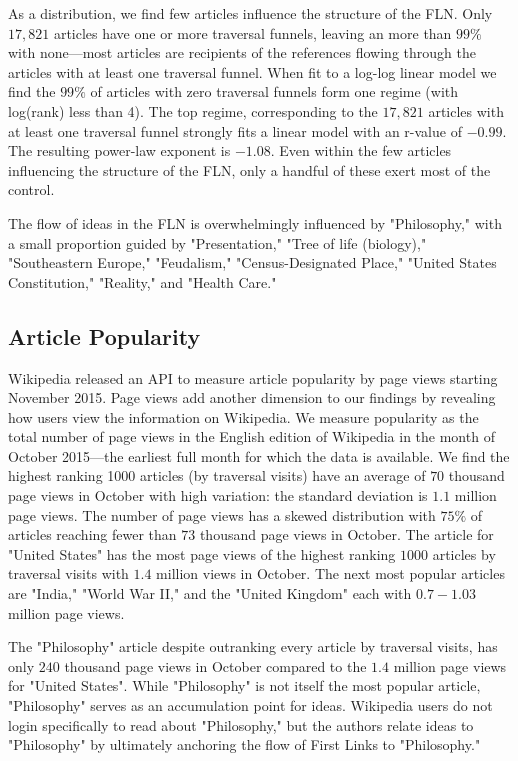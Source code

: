 \documentclass[pre,twocolumn,twoside,superscriptaddress,floatfix, aps, 10pt]{revtex4-1}
\begin{document}
As a distribution, we find few articles influence the structure of the 
FLN. Only $17, 821$ articles have one or more traversal funnels, leaving
an more than $99\%$ with none---most articles are recipients of 
the references flowing through the articles with at least one traversal funnel.
When fit to a log-log linear model we find the $99\%$ of articles with zero
traversal funnels form one regime (with log(rank) less than 4).
The top regime, corresponding to the $17, 821$ articles with at least one 
traversal funnel strongly fits a linear model with an r-value of $-0.99$. 
The resulting power-law exponent is $-1.08$. Even within the few articles
influencing the structure of the FLN, only a handful of these exert most of the 
control. 

The flow of ideas in the FLN is overwhelmingly influenced by "Philosophy,"
with a small proportion guided by "Presentation," "Tree of life (biology)," "Southeastern Europe," 
"Feudalism," "Census-Designated Place," "United States Constitution," "Reality," and "Health Care."



\subsection{Article Popularity}

Wikipedia released an API to measure article popularity by page views
starting November 2015. Page views add another dimension to our
findings by revealing 
how users view the information on Wikipedia. 
We measure popularity as the total number 
of page views in the English edition of Wikipedia in the month of 
October 2015---the earliest full month for which the data is available. 
We find the highest ranking 1000 articles (by traversal visits) have an average of
$70$ thousand page views in October with high variation: the standard deviation 
is $1.1$ million page views. 
The number of page views has a skewed distribution with $75\%$ of articles
reaching fewer than $73$ thousand page views in October.
The article for "United States" has the most page 
views of the highest ranking $1000$ articles by traversal visits with 
$1.4$ million views in October. The next most popular articles are 
"India," "World War II," and the "United Kingdom" each with $0.7-1.03$ million page views. 


The "Philosophy" article despite outranking every article by traversal visits,
has only $240$ thousand page views in October compared to the $1.4$ million
page views for "United States".
While "Philosophy" is not itself the most popular article, "Philosophy" serves as 
an accumulation point for ideas. Wikipedia users do not login specifically
to read about "Philosophy," but the authors relate ideas to "Philosophy" 
by ultimately anchoring the flow of First Links to "Philosophy."
\end{document}
